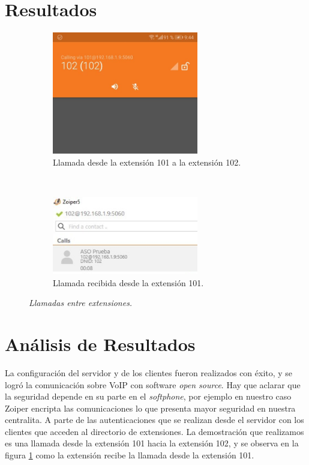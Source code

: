 \documentclass[conference]{IEEEtran}
\begin{document}
\section{Resultados}
\begin{figure}[H]
    \begin{subfigure}[h]{0.5\textwidth}
       \centerline{\includegraphics[width=0.7\textwidth]{img/metc05.jpeg}}
        \caption{Llamada desde la extensión 101 a la extensión 102.}

    \end{subfigure}
    ~ %
     \begin{subfigure}[h]{0.5\textwidth}
        \centerline{\includegraphics[width=0.7\textwidth]{img/metc06.jpeg}}
        \caption{Llamada recibida desde la extensión 101.}

    \end{subfigure}
    \caption{\textit{Llamadas entre extensiones.}}
\label{fig:metc3}
\end{figure}

\section{Análisis de Resultados}
La configuración del servidor y de los clientes fueron realizados con éxito, y se logró la comunicación sobre VoIP con software \textit{open source}. Hay que aclarar que la seguridad depende en su parte en el \textit{softphone}, por ejemplo en nuestro caso Zoiper encripta las comunicaciones lo que presenta mayor seguridad en nuestra centralita. A parte de las autenticaciones que se realizan desde el servidor con los clientes que acceden al directorio de extensiones. La demostración que realizamos es una llamada desde la extensión 101 hacia la extensión 102, y se observa en la figura \ref{fig:metc3} como la extensión recibe la llamada desde la extensión 101.
\end{document}
